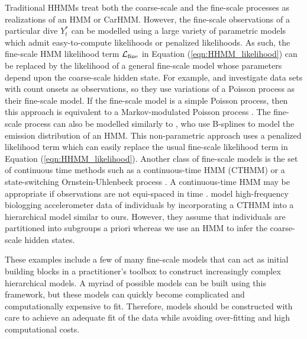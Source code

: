 Traditional HHMMs treat both the coarse-scale and the fine-scale processes as realizations of an HMM or CarHMM. 
However, the fine-scale observations of a particular dive $Y^*_t$ can be modelled using a large variety of parametric models which admit easy-to-compute likelihoods or penalized likelihoods. As such, the fine-scale HMM likelihood term $\mathcal{L}_{\text{fine}}$ in Equation (\ref{eqn:HHMM_likelihood}) can be replaced by the likelihood of a general fine-scale model whose parameters depend upon the coarse-scale hidden state.
%
For example, \citet{Bebbington:2007} and \citet{Borchers:2013} investigate data sets with count onsets as observations, so they use variations of a Poisson process as their fine-scale model. If the fine-scale model is a simple Poisson process, then this approach is equivalent to a Markov-modulated Poisson process \citep{Fischer:1993}.
The fine-scale process can also be modelled similarly to \citet{Langrock:2018}, who use B-splines to model the emission distribution of an HMM. This non-parametric approach uses a penalized likelihood term which can easily replace the usual fine-scale likelihood term in Equation (\ref{eqn:HHMM_likelihood}). 
Another class of fine-scale models is the set of continuous time methods such as a continuous-time HMM (CTHMM) \citep{Liu:2015} or a state-switching Ornstein-Uhlenbeck process \citep{Michelot:2019}. 
A continuous-time HMM may be appropriate if observations are not equi-spaced in time \citep{Liu:2015}. \citet{Xu:2018} model high-frequency biologging accelerometer data of individuals by incorporating a CTHMM into a hierarchical model similar to ours. However, they assume that individuals are partitioned into subgroups a priori whereas we use an HMM to infer the coarse-scale hidden states.

These examples include a few of many fine-scale models that can act as initial building blocks in a practitioner's toolbox to construct increasingly complex hierarchical models. 
A myriad of possible models can be built using this framework, but these models can quickly become complicated and computationally expensive to fit. Therefore, models should be constructed with care to achieve an adequate fit of the data while avoiding over-fitting and high computational costs.